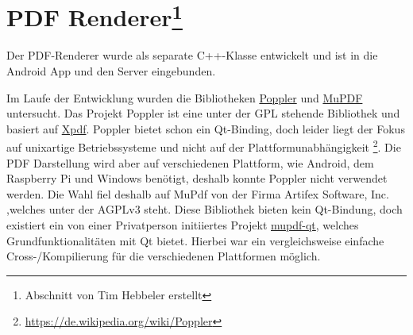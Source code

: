 \chapter[PDF Renderer]{PDF Renderer\footnote{Abschnitt von Tim Hebbeler erstellt}}
\thispagestyle{fancy}

Der PDF-Renderer wurde als separate C++-Klasse entwickelt und ist in die Android App und den Server eingebunden.

Im Laufe der Entwicklung wurden die Bibliotheken \href{https://poppler.freedesktop.org/}{Poppler} und \href{http://mupdf.com/}{MuPDF} untersucht. Das Projekt Poppler ist eine unter der GPL stehende Bibliothek und basiert auf \href{https://de.wikipedia.org/wiki/Xpdf}{Xpdf}. Poppler bietet schon ein Qt-Binding, doch leider liegt der Fokus auf unixartige Betriebssysteme und nicht auf der Plattformunabhängigkeit \footnote{\url{https://de.wikipedia.org/wiki/Poppler}}. Die PDF Darstellung wird aber auf verschiedenen Plattform, wie Android, dem Raspberry Pi und Windows benötigt, deshalb konnte Poppler nicht verwendet werden.
Die Wahl fiel deshalb auf MuPdf von der Firma Artifex Software, Inc. ,welches unter der AGPLv3 steht. Diese Bibliothek bieten kein Qt-Bindung, doch existiert ein von einer Privatperson initiiertes Projekt \href{https://github.com/xiangxw/mupdf-qt}{mupdf-qt}, welches Grundfunktionalitäten mit Qt bietet. Hierbei war ein vergleichsweise einfache Cross-/Kompilierung für die verschiedenen Plattformen möglich.

